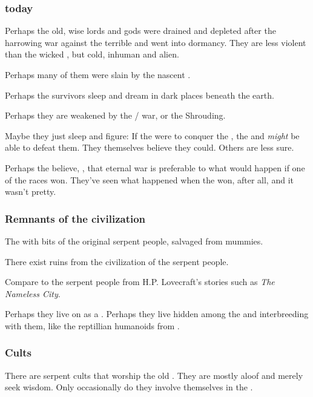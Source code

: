 \subsubsection{\Ophidians{} today}
Perhaps the old, wise \ophidian{} lords and gods were drained and depleted after the harrowing war against the terrible \xzaishanns{} and went into dormancy. 
They are less violent than the wicked \draecchonosh, but cold, inhuman and alien. 

Perhaps many of them were slain by the nascent \draecchonosh. 

Perhaps the survivors sleep and dream in dark places beneath the earth. 

Perhaps they are weakened by the \dragon/\bane{} war, or the Shrouding. 

Maybe they just sleep and figure: 
If the \banes{} were to conquer the \dragons, the \ophidians{} and \nagae{} \emph{might} be able to defeat them. 
They themselves believe they could. 
Others are less sure. 

Perhaps the \ophidians{} believe, , that eternal war is preferable to what would happen if one of the races won. 
They've seen what happened when the \draecchonosh{} won, after all, and it wasn't pretty. 





\subsubsection{Remnants of the \ophidian{} civilization}
The \scathae{}  with bits of the original serpent people, salvaged from mummies. 

There exist ruins from the civilization of the serpent people. 

Compare to the serpent people from H.P. Lovecraft's stories such as \emph{The Nameless City}.

Perhaps they live on as a . Perhaps they live hidden among the \scathae{} and interbreeding with them, like the reptillian humanoids from \DIBiggestSecret. 







\subsubsection{Cults}
There are serpent cults that worship the old \ophidians. They are mostly aloof and merely seek wisdom. Only occasionally do they involve themselves in the \feud. 







